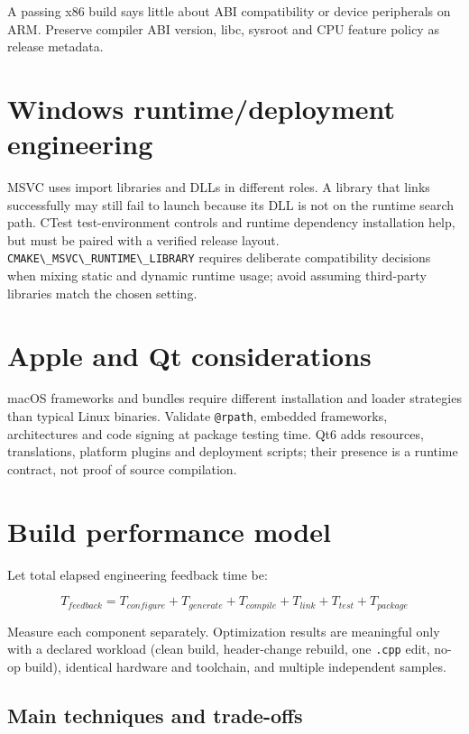 \documentclass[11pt,letterpaper,oneside]{report}
\providecommand{\passthrough}[1]{#1}
\begin{document}
A passing x86 build says little about ABI compatibility or device
peripherals on ARM. Preserve compiler ABI version, libc, sysroot and CPU
feature policy as release metadata.

\chapter{Windows runtime/deployment
engineering}\label{windows-runtimedeployment-engineering}

MSVC uses import libraries and DLLs in different roles. A library that
links successfully may still fail to launch because its DLL is not on
the runtime search path. CTest test-environment controls and runtime
dependency installation help, but must be paired with a verified release
layout. \passthrough{\lstinline!CMAKE\_MSVC\_RUNTIME\_LIBRARY!} requires
deliberate compatibility decisions when mixing static and dynamic
runtime usage; avoid assuming third-party libraries match the chosen
setting.

\chapter{Apple and Qt considerations}\label{apple-and-qt-considerations}

macOS frameworks and bundles require different installation and loader
strategies than typical Linux binaries. Validate
\passthrough{\lstinline!@rpath!}, embedded frameworks, architectures and
code signing at package testing time. Qt6 adds resources, translations,
platform plugins and deployment scripts; their presence is a runtime
contract, not proof of source compilation.

\chapter{Build performance model}\label{build-performance-model}

Let total elapsed engineering feedback time be:

\[
T_{feedback} = T_{configure} + T_{generate} + T_{compile} + T_{link} + T_{test} + T_{package}
\]

Measure each component separately. Optimization results are meaningful
only with a declared workload (clean build, header-change rebuild, one
\passthrough{\lstinline!.cpp!} edit, no-op build), identical hardware
and toolchain, and multiple independent samples.

\section{Main techniques and
trade-offs}\label{main-techniques-and-trade-offs}
\end{document}
